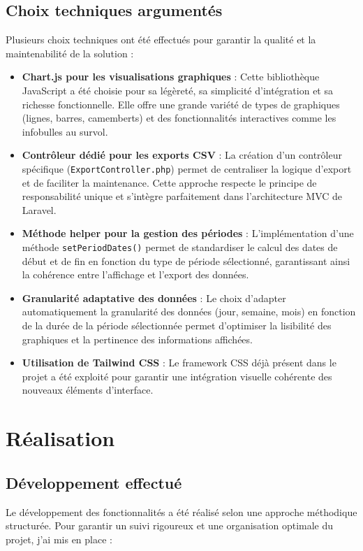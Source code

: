 \documentclass[a4paper,12pt]{report}
\begin{document}
\newpage
  \subsection{Choix techniques argumentés}
  Plusieurs choix techniques ont été effectués pour garantir la qualité et la maintenabilité de la solution :
  
  \begin{itemize}
    \item \textbf{Chart.js pour les visualisations graphiques} : Cette bibliothèque JavaScript a été choisie pour sa légèreté, sa simplicité d'intégration et sa richesse fonctionnelle. Elle offre une grande variété de types de graphiques (lignes, barres, camemberts) et des fonctionnalités interactives comme les infobulles au survol.
    
    \item \textbf{Contrôleur dédié pour les exports CSV} : La création d'un contrôleur spécifique (\texttt{ExportController.php}) permet de centraliser la logique d'export et de faciliter la maintenance. Cette approche respecte le principe de responsabilité unique et s'intègre parfaitement dans l'architecture MVC de Laravel.
    
    \item \textbf{Méthode helper pour la gestion des périodes} : L'implémentation d'une méthode \texttt{setPeriodDates()} permet de standardiser le calcul des dates de début et de fin en fonction du type de période sélectionné, garantissant ainsi la cohérence entre l'affichage et l'export des données.
    
    \item \textbf{Granularité adaptative des données} : Le choix d'adapter automatiquement la granularité des données (jour, semaine, mois) en fonction de la durée de la période sélectionnée permet d'optimiser la lisibilité des graphiques et la pertinence des informations affichées.
    
    \item \textbf{Utilisation de Tailwind CSS} : Le framework CSS déjà présent dans le projet a été exploité pour garantir une intégration visuelle cohérente des nouveaux éléments d'interface.
  \end{itemize}

\newpage
\section{Réalisation}
  \subsection{Développement effectué}
  Le développement des fonctionnalités a été réalisé selon une approche méthodique structurée. Pour garantir un suivi rigoureux et une organisation optimale du projet, j'ai mis en place :
  
\end{document}

